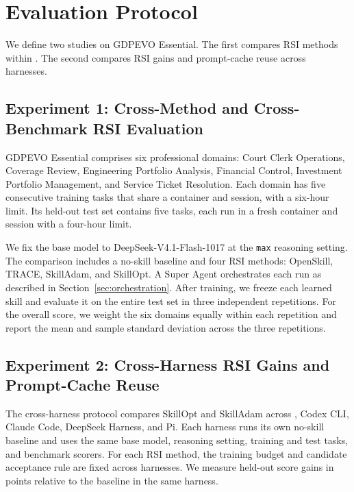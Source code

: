 \section{Evaluation Protocol}
\label{sec:experiments}

We define two studies on GDPEVO Essential. The first compares RSI methods within \fwname. The second compares RSI gains and prompt-cache reuse across harnesses.

\subsection{Experiment 1: Cross-Method and Cross-Benchmark RSI Evaluation}
\label{sec:experiment-rsi}

GDPEVO Essential comprises six professional domains: Court Clerk Operations, Coverage Review, Engineering Portfolio Analysis, Financial Control, Investment Portfolio Management, and Service Ticket Resolution. Each domain has five consecutive training tasks that share a container and session, with a six-hour limit. Its held-out test set contains five tasks, each run in a fresh container and session with a four-hour limit.

We fix the base model to DeepSeek-V4.1-Flash-1017 at the \texttt{max} reasoning setting. The comparison includes a no-skill baseline and four RSI methods: OpenSkill, TRACE, SkillAdam, and SkillOpt. A Super Agent orchestrates each run as described in Section~\ref{sec:orchestration}. After training, we freeze each learned skill and evaluate it on the entire test set in three independent repetitions. For the overall score, we weight the six domains equally within each repetition and report the mean and sample standard deviation across the three repetitions.

\subsection{Experiment 2: Cross-Harness RSI Gains and Prompt-Cache Reuse}
\label{sec:experiment-harness}

The cross-harness protocol compares SkillOpt and SkillAdam across \fwname, Codex CLI, Claude Code, DeepSeek Harness, and Pi. Each harness runs its own no-skill baseline and uses the same base model, reasoning setting, training and test tasks, and benchmark scorers. For each RSI method, the training budget and candidate acceptance rule are fixed across harnesses. We measure held-out score gains in points relative to the baseline in the same harness.

